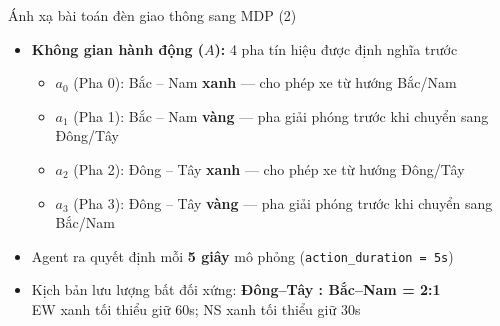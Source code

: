 \begin{frame}{Ánh xạ bài toán đèn giao thông sang MDP (2)}
\begin{itemize}
    \item \textbf{Không gian hành động ($A$):} 4 pha tín hiệu được định nghĩa trước
    \begin{itemize}
        \item $a_0$ (Pha 0): Bắc -- Nam \textbf{xanh} — cho phép xe từ hướng Bắc/Nam
        \item $a_1$ (Pha 1): Bắc -- Nam \textbf{vàng} — pha giải phóng trước khi chuyển sang Đông/Tây
        \item $a_2$ (Pha 2): Đông -- Tây \textbf{xanh} — cho phép xe từ hướng Đông/Tây
        \item $a_3$ (Pha 3): Đông -- Tây \textbf{vàng} — pha giải phóng trước khi chuyển sang Bắc/Nam
    \end{itemize}
    \item Agent ra quyết định mỗi \textbf{5 giây} mô phỏng (\texttt{action\_duration = 5s})
    \item Kịch bản lưu lượng bất đối xứng: \textbf{Đông--Tây : Bắc--Nam = 2:1}\\
          EW xanh tối thiểu giữ 60s; NS xanh tối thiểu giữ 30s
\end{itemize}
\end{frame}

